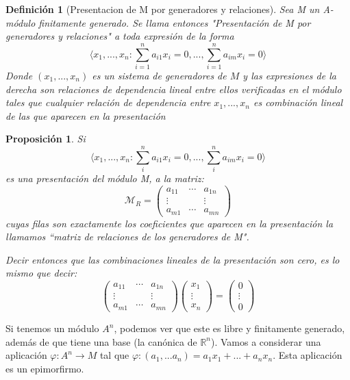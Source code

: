 \documentclass[11pt, a4paper, titlepage]{article}
\theoremstyle{theorem-style}
\newtheorem*{nprop}{Proposición}
\theoremstyle{definition-style}
\newtheorem*{ndef}{Definición}
\theoremstyle{remark-style}
\theoremstyle{example-style}
\begin{document}
\begin{ndef}[Presentacion de M por generadores y relaciones]
	Sea M un A-módulo finitamente generado. Se llama entonces "Presentación de M por generadores y relaciones" a toda expresión de la forma
	\[
	\langle x_1,...,x_n : \sum_{i=1}^n a_{i1}x_i = 0,...,\sum_{i=1}^n a_{im}x_i = 0 \rangle
	\]
	Donde $(x_1,...,x_n)$ es un sistema de generadores de $M$ y las expresiones de la derecha son relaciones de dependencia lineal entre ellos verificadas en el módulo tales que cualquier relación de dependencia entre $x_1,...,x_n$ es combinación lineal de las que aparecen en la presentación
	
\end{ndef}

\begin{nprop}
		Si 
	\[
	\langle x_1,...,x_n : \sum_i^n a_{i1}x_i = 0,...,\sum_i^n a_{im}x_i = 0 \rangle
	\]
	es una presentación del módulo M, a la matriz:
	\[
	\mathcal{M}_R = \begin{pmatrix}
 a_{11} & \cdots & a_{1n}\\
 \vdots & & \vdots\\
 a_{m1} & \cdots & a_{mn} 
\end{pmatrix} 
	\]
	cuyas filas son exactamente los coeficientes que aparecen en la presentación la llamamos “matriz de relaciones de los generadores de M".
	
	Decir entonces que las combinaciones lineales de la presentación son cero, es lo mismo que decir:
	\[
	\begin{pmatrix}
 a_{11} & \cdots & a_{1n}\\
 \vdots & & \vdots\\
 a_{m1} & \cdots & a_{mn} 
\end{pmatrix} \begin{pmatrix}
 x_1  \\
 \vdots\\
 x_n 
\end{pmatrix} =  \begin{pmatrix}
 0  \\
 \vdots\\
 0
\end{pmatrix} 
	\]
\end{nprop}

	
	Si tenemos un módulo $A^n$, podemos ver que este es libre y finitamente generado, además de que tiene una base (la canónica de $\mathbb{R}^n$). Vamos a considerar una aplicación $\varphi: A^n \to M$ tal que $\varphi:(a_1,...a_n) = a_1x_1+...+a_nx_n$. Esta aplicación es un epimorfirmo.
\end{document}
